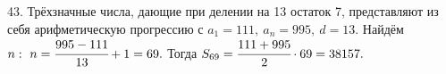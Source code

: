 43. Трёхзначные числа, дающие при делении на 13 остаток 7, представляют из себя арифметическую прогрессию с $a_1=111,\ a_n=995,\ d=13.$ Найдём $n:\ n=\cfrac{995-111}{13}+1=69.$ Тогда $S_{69}=\cfrac{111+995}{2}\cdot69=38157.$\\
